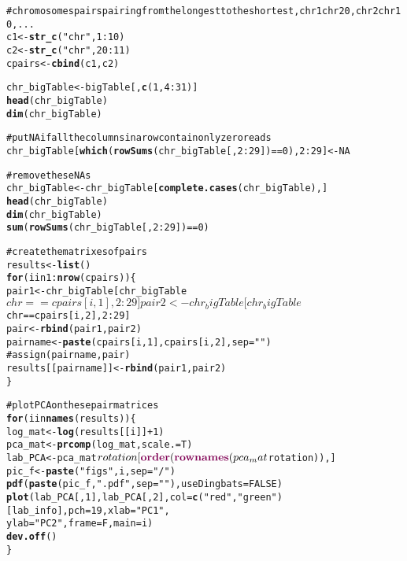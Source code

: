 \documentclass{article}\usepackage{graphicx, color}
\makeatletter
\newcommand{\hlfunctioncall}[1]{\textcolor[rgb]{0.501960784313725,0,0.329411764705882}{\textbf{#1}}}%
\newcommand{\hlstring}[1]{\textcolor[rgb]{0.6,0.6,1}{#1}}%
\newcommand{\hlcomment}[1]{\textcolor[rgb]{0.180392156862745,0.6,0.341176470588235}{#1}}%
\newenvironment{kframe}{%
 \def\at@end@of@kframe{}%
 \ifinner\ifhmode%
  \def\at@end@of@kframe{\end{minipage}}%
  \begin{minipage}{\columnwidth}%
 \fi\fi%
 \def\FrameCommand##1{\hskip\@totalleftmargin \hskip-\fboxsep
 \colorbox{shadecolor}{##1}\hskip-\fboxsep
     \hskip-\linewidth \hskip-\@totalleftmargin \hskip\columnwidth}%
 \MakeFramed {\advance\hsize-\width
   \@totalleftmargin\z@ \linewidth\hsize
   \@setminipage}}%
 {\par\unskip\endMakeFramed%
 \at@end@of@kframe}
\newenvironment{knitrout}{}{} %
\makeatother
\begin{document}
\begin{knitrout}
\color{fgcolor}\begin{kframe}
\begin{alltt}

\hlcomment{# chromosomes pairs pairing from the longest to the shortest, chr1 chr20, chr2 chr10, ...}
c1 <- \hlfunctioncall{str_c}(\hlstring{"chr"}, 1:10)
c2 <- \hlfunctioncall{str_c}(\hlstring{"chr"}, 20:11)
cpairs <- \hlfunctioncall{cbind}(c1, c2)

chr_bigTable <- bigTable[, \hlfunctioncall{c}(1, 4:31)]
\hlfunctioncall{head}(chr_bigTable)
\hlfunctioncall{dim}(chr_bigTable)

\hlcomment{# put NA if all the columns in a row contain only zero reads}
chr_bigTable[\hlfunctioncall{which}(\hlfunctioncall{rowSums}(chr_bigTable[, 2:29]) == 0), 2:29] <- NA

\hlcomment{# remove these NAs}
chr_bigTable <- chr_bigTable[\hlfunctioncall{complete.cases}(chr_bigTable), ]
\hlfunctioncall{head}(chr_bigTable)
\hlfunctioncall{dim}(chr_bigTable)
\hlfunctioncall{sum}(\hlfunctioncall{rowSums}(chr_bigTable[, 2:29]) == 0)

\hlcomment{# create the matrixes of pairs}
results <- \hlfunctioncall{list}()
\hlfunctioncall{for} (i in 1:\hlfunctioncall{nrow}(cpairs)) \{
    pair1 <- chr_bigTable[chr_bigTable$chr == cpairs[i, 1], 2:29]
    pair2 <- chr_bigTable[chr_bigTable$chr == cpairs[i, 2], 2:29]
    pair <- \hlfunctioncall{rbind}(pair1, pair2)
    pairname <- \hlfunctioncall{paste}(cpairs[i, 1], cpairs[i, 2], sep = \hlstring{""})
\hlcomment{    # assign(pairname, pair)}
    results[[pairname]] <- \hlfunctioncall{rbind}(pair1, pair2)
\}

\hlcomment{# plot PCA on these pair matrices}
\hlfunctioncall{for} (i in \hlfunctioncall{names}(results)) \{
    log_mat <- \hlfunctioncall{log}(results[[i]] + 1)
    pca_mat <- \hlfunctioncall{prcomp}(log_mat, scale. = T)
    lab_PCA <- pca_mat$rotation[\hlfunctioncall{order}(\hlfunctioncall{rownames}(pca_mat$rotation)), ]
    pic_f <- \hlfunctioncall{paste}(\hlstring{"figs"}, i, sep = \hlstring{"/"})
    \hlfunctioncall{pdf}(\hlfunctioncall{paste}(pic_f, \hlstring{".pdf"}, sep = \hlstring{""}), useDingbats = FALSE)
    \hlfunctioncall{plot}(lab_PCA[, 1], lab_PCA[, 2], col = \hlfunctioncall{c}(\hlstring{"red"}, \hlstring{"green"})[lab_info], pch = 19, xlab = \hlstring{"PC1"}, 
        ylab = \hlstring{"PC2"}, frame = F, main = i)
    \hlfunctioncall{dev.off}()
\}


\end{alltt}
\end{kframe}
\end{knitrout}
\end{document}
